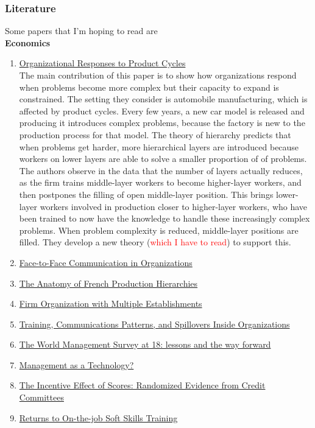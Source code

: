 \documentclass[source/paper/main.tex]{subfiles}
\begin{document}
\subsubsection{Literature} 
Some papers that I'm hoping to read are\\
\textbf{Economics}
\begin{enumerate}
    \item \hyperlink{https://www.hbs.edu/ris/Publication\%20Files/23-061_d9d37062-d3d7-4377-a959-81f75337916d.pdf}{Organizational Responses to Product Cycles}\\
    The main contribution of this paper is to show how organizations respond when problems become more complex but their capacity to expand is constrained. The setting they consider is automobile manufacturing, which is affected by product cycles. Every few years, a new car model is released and producing it introduces complex problems, because the factory is new to the production process for that model. The theory of hierarchy predicts that when problems get harder, more hierarchical layers are introduced because workers on lower layers are able to solve a smaller proportion of of problems. The authors observe in the data that the number of layers actually reduces, as the firm trains middle-layer workers to become higher-layer workers, and then postpones the filling of open middle-layer position. This brings lower-layer workers involved in production closer to higher-layer workers, who have been trained to now have the knowledge to handle these increasingly complex problems. When problem complexity is reduced, middle-layer positions are filled. They develop a new theory (\textcolor{red}{which I have to read}) to support this. 
    \item \hyperlink{https://academic.oup.com/restud/article-abstract/88/2/574/5922651?redirectedFrom=fulltext}{Face-to-Face Communication in Organizations}
    \item \hyperlink{https://spinup-000d1a-wp-offload-media.s3.amazonaws.com/faculty/wp-content/uploads/sites/40/2019/06/AFPH.pdf}{The Anatomy of French Production Hierarchies}
    \item \hyperlink{https://academic.oup.com/qje/article/137/2/1091/6481649}{Firm Organization with Multiple Establishments}
    \item \hyperlink{https://www.nber.org/papers/w30224}{Training, Communications Patterns, and Spillovers Inside Organizations}
    \item \hyperlink{https://academic.oup.com/oxrep/article-abstract/37/2/231/6311333?redirectedFrom=fulltext}{The World Management Survey at 18: lessons and the way forward}
    \item \hyperlink{https://worldmanagementsurvey.org/wp-content/uploads/2016/07/w22327.pdf}{Management as a Technology?}
    \item \hyperlink{https://drive.google.com/file/d/0B49txSZyKZcFV0lnYTZSa3l0Y1U/view?resourcekey=0-VT4ZQPV2aUJU-_PJ95pPKw}{The Incentive Effect of Scores: Randomized Evidence from Credit Committees}
    \item \hyperlink{https://www.dropbox.com/scl/fi/vvclf3nl45h9ngwimpmyd/PACE_dec2021.pdf?rlkey=pvsydc2bnd2nxyph4aixuzlov&e=1&dl=0}{Returns to On-the-job Soft Skills Training}
\end{enumerate}
\end{document}

